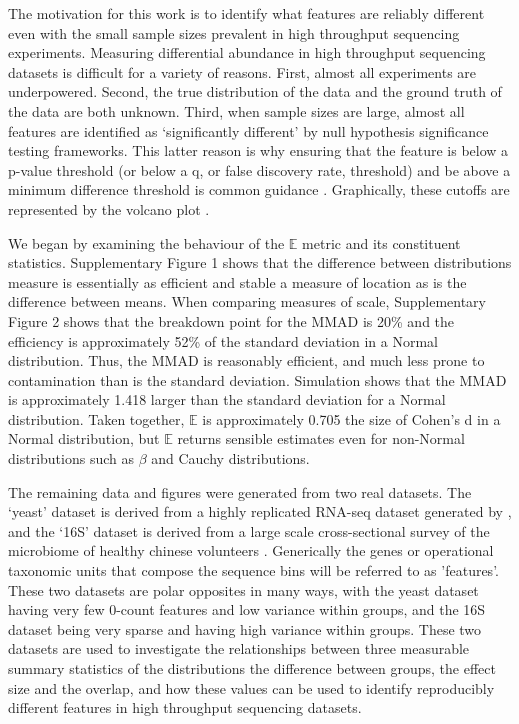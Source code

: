 \documentclass[fleqn,10pt,lineno]{wlpeerj}
\begin{document}
The motivation for this work is to identify what features are reliably different even with the small sample sizes prevalent in high throughput sequencing experiments. Measuring differential abundance in high throughput sequencing datasets is difficult for a variety of reasons. First, almost all experiments are underpowered. Second, the true distribution of the data and the ground truth of the data are both unknown. Third, when sample sizes are large, almost all features are identified as `significantly different' by null hypothesis significance testing frameworks. This latter reason is why ensuring that the feature is below a p-value threshold (or below a q, or false discovery rate,  threshold) and be above a minimum difference threshold is common guidance \citep{Schurch:2016aa}. Graphically, these cutoffs are represented by the volcano plot \citep{Cui:2003aa}. 

We began by examining the behaviour of the $\mathbb{E}$ metric and its constituent statistics. Supplementary Figure 1 shows that the difference between distributions  measure is essentially as efficient and stable a measure of location as is the difference between means. When comparing measures of scale, Supplementary Figure 2 shows that the breakdown point for the MMAD is 20\% and the efficiency is approximately 52\% of the standard deviation in a Normal distribution. Thus, the MMAD is reasonably efficient, and much less prone to contamination than is the standard deviation. Simulation shows that the MMAD is approximately 1.418 larger than the standard deviation for a Normal distribution. Taken together, $\mathbb{E}$  is approximately  0.705 the size of Cohen's d in a Normal distribution, but $\mathbb{E}$ returns sensible estimates even for non-Normal distributions such as $\beta$ and Cauchy distributions. 

The remaining data and figures were generated from two real datasets. The `yeast' dataset is derived from a highly replicated RNA-seq dataset generated by \citep{Schurch:2016aa}, and the `16S' dataset is derived from a large scale cross-sectional survey of the microbiome of healthy chinese volunteers \citep{bian:2017}. Generically the genes or operational taxonomic units that compose the sequence bins will be referred to as 'features'. These two datasets are polar opposites in many ways, with the yeast dataset having very few 0-count features and low variance within groups, and the 16S dataset being very sparse and having high variance within groups. These two datasets are used to investigate the relationships between three measurable summary statistics of the distributions the difference between groups, the effect size and the overlap, and how these values can be used to identify reproducibly different features in high throughput sequencing datasets.
\end{document}
